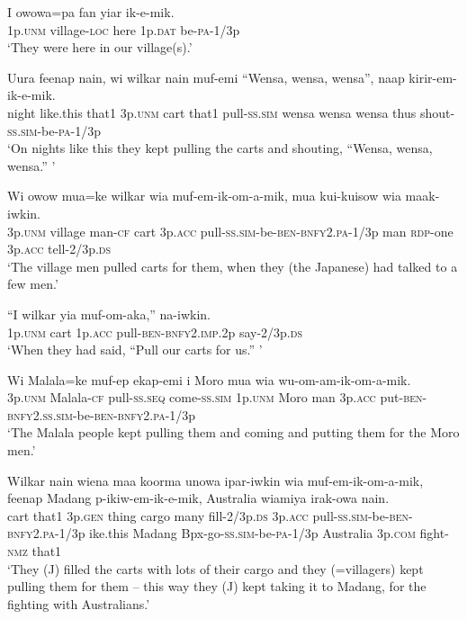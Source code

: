 \ea
\gll  I  owowa=pa  fan  yiar  ik-e-mik. \\
1p.\textsc{unm}  village-\textsc{loc}  here  1p.\textsc{dat}  be-\textsc{pa}-1/3p \\
\glt ‘They were here in our village(s).’ \\
\z


\ea
\gll  Uura  feenap  nain,  wi  wilkar  nain  muf-emi “Wensa,  wensa,  wensa”,  naap  kirir-em-ik-e-mik.\\
night  like.this  that1  3p.\textsc{unm}  cart  that1  pull-\textsc{ss}.\textsc{sim} wensa  wensa  wensa  thus  shout-\textsc{ss}.\textsc{sim}-be-\textsc{pa}-1/3p \\ 
\glt ‘On nights like this they kept pulling the carts and shouting, “Wensa, wensa, wensa.” ’ \\
\z


\ea
\gll  Wi  owow  mua=ke  wilkar  wia muf-em-ik-om-a-mik,  mua  kui-kuisow wia  maak-iwkin.\\
3p.\textsc{unm}  village  man-\textsc{cf}  cart  3p.\textsc{acc} pull-\textsc{ss}.\textsc{sim}-be-\textsc{ben}-\textsc{bnfy}2.\textsc{pa}-1/3p  man  \textsc{rdp}-one 3p.\textsc{acc}  tell-2/3p.\textsc{ds}\\ 
\glt ‘The village men pulled carts for them, when they (the Japanese) had talked to a few men.’ \\
\z


\ea
\gll  “I  wilkar  yia  muf-om-aka,”  na-iwkin. \\
1p.\textsc{unm}  cart  1p.\textsc{acc}  pull-\textsc{ben}-\textsc{bnfy}2.\textsc{imp}.2p  say-2/3p.\textsc{ds} \\
\glt ‘When they had said, “Pull our carts for us.” ’ \\
\z


\ea
\gll  Wi  Malala=ke  muf-ep  ekap-emi  i  Moro mua  wia  wu-om-am-ik-om-a-mik.\\
3p.\textsc{unm}  Malala-\textsc{cf}  pull-\textsc{ss.seq}  come-\textsc{ss}.\textsc{sim}  1p.\textsc{unm}  Moro man  3p.\textsc{acc}  put-\textsc{ben}-\textsc{bnfy}2.\textsc{ss}.\textsc{sim}-be-\textsc{ben}-\textsc{bnfy}2.\textsc{pa}-1/3p \\ 
\glt ‘The Malala people kept pulling them and coming and putting them for the Moro men.’ \\
\z


\ea
\gll  Wilkar  nain  wiena  maa  koorma  unowa  ipar-iwkin wia  muf-em-ik-om-a-mik, feenap  Madang  p-ikiw-em-ik-e-mik, Australia  wiamiya  irak-owa  nain. \\
cart  that1  3p.\textsc{gen}  thing  cargo  many  fill-2/3p.\textsc{ds} 3p.\textsc{acc}  pull-\textsc{ss}.\textsc{sim}-be-\textsc{ben}-\textsc{bnfy}2.\textsc{pa}-1/3p ike.this  Madang  Bpx-go-\textsc{ss}.\textsc{sim}-be-\textsc{pa}-1/3p Australia  3p.\textsc{com}  fight-\textsc{nmz}  that1\\ 
\glt ‘They (J) filled the carts with lots of their cargo and they (=villagers) kept pulling them for them  – this way they (J) kept taking it to Madang, for the fighting with Australians.’ \\
\z


